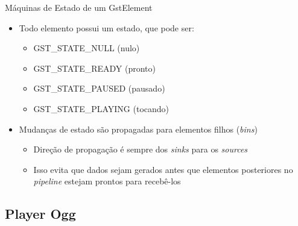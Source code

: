 \documentclass{beamer}
\def\en#1{\foreignlanguage{english}{\emph{#1}}}
\begin{document}
\begin{frame}[c]{Máquinas de Estado de um GstElement}
  \begin{itemize}
    \item Todo elemento possui um estado, que pode ser:
      \begin{itemize}
        \item GST\_STATE\_NULL (nulo)
        \item GST\_STATE\_READY (pronto)
        \item GST\_STATE\_PAUSED (pausado)
        \item GST\_STATE\_PLAYING (tocando)
      \end{itemize}
    \item Mudanças de estado são propagadas para elementos filhos (\en{bins})
      \begin{itemize}
        \item Direção de propagação é sempre dos \en{sinks} para
          os \en{sources}
        \item Isso evita que dados sejam gerados antes que elementos
          posteriores no \en{pipeline} estejam prontos para recebê-los
      \end{itemize}
  \end{itemize}

  \begin{figure}[h]
    \centering
  \end{figure}
\end{frame}

\subsection{Player Ogg}
\end{document}
